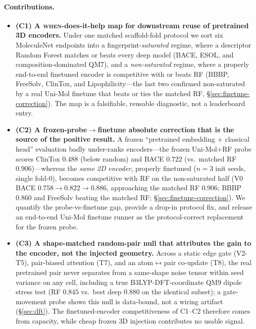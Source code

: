 \documentclass[sigconf,nonacm,anonymous,review]{acmart}
\begin{document}
\paragraph{Contributions.}
\begin{itemize}
\item \textbf{(C1) A \textsc{when}-does-it-help map for downstream reuse of pretrained 3D encoders.} Under one matched scaffold-fold protocol we sort six MoleculeNet endpoints into a fingerprint-\emph{saturated} regime, where a descriptor Random Forest matches or beats every deep model (BACE, ESOL, and composition-dominated QM7), and a \emph{non-saturated} regime, where a properly end-to-end finetuned encoder is competitive with or beats RF (BBBP, FreeSolv, ClinTox, and Lipophilicity---the last two confirmed non-saturated by a real Uni-Mol finetune that beats or ties the matched RF, \S\ref{sec:finetune-correction}). The map is a falsifiable, reusable diagnostic, not a leaderboard entry.

\item \textbf{(C2) A frozen-probe$\rightarrow$finetune absolute correction that is the source of the positive result.} A frozen ``pretrained embedding $+$ classical head'' evaluation badly under-ranks encoders---the frozen Uni-Mol$+$RF probe scores ClinTox $0.488$ (below random) and BACE $0.722$ (vs.\ matched RF $0.906$)---whereas the \emph{same 2D encoder}, properly finetuned ($n{=}3$ init seeds, single fold-0), becomes competitive with RF on the non-saturated half (V0 BACE $0.758\!\rightarrow\!0.822\!\rightarrow\!0.886$, approaching the matched RF $0.906$; BBBP $0.860$ and FreeSolv beating the matched RF; \S\ref{sec:finetune-correction}). We quantify the probe-vs-finetune gap, provide a drop-in protocol fix, and release an end-to-end Uni-Mol finetune runner as the protocol-correct replacement for the frozen probe.

\item \textbf{(C3) A shape-matched random-pair null that attributes the gain to the encoder, not the injected geometry.} Across a static edge gate (V2-T5), pair-biased attention (T7), and an atom$\leftrightarrow$pair co-update (T8), the real pretrained pair never separates from a same-shape noise tensor within seed variance on any cell, including a true B3LYP-DFT-coordinate QM9 dipole stress test (RF $0.845$ vs.\ best deep $0.880$ on the identical subset); a gate-movement probe shows this null is data-bound, not a wiring artifact (\S\ref{sec:dft}). The finetuned-encoder competitiveness of C1--C2 therefore comes from capacity, while cheap frozen 3D injection contributes no usable signal.


\end{itemize}
\end{document}
